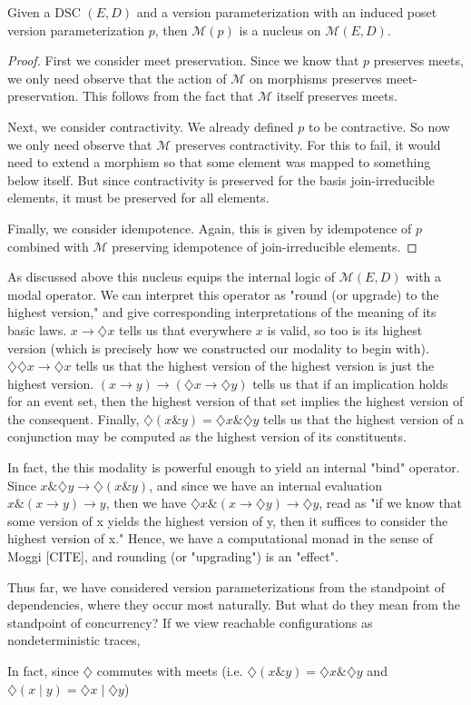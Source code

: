 \documentclass[hoptionsi,review,format=acmsmall]{acmart}
\theoremstyle{definition}
\newcommand{\Mcc}{\mathcal{M}}
\newcommand{\band}{\mathbin{\&}}
\newcommand{\bor}{\mathbin{|}}
\newcommand{\Dia}{\diamondsuit}
\begin{document}
\begin{theorem}
Given a DSC \((E,D)\) and a version parameterization with an induced poset version parameterization \(p\), then \(\Mcc(p)\) is a nucleus on \(\Mcc(E,D)\).
\end{theorem}
\begin{proof}
First we consider meet preservation. Since we know that \(p\) preserves meets, we only need observe that the action of \(\Mcc\) on morphisms preserves meet-preservation. This follows from the fact that \(\Mcc\) itself preserves meets.


Next, we consider contractivity. We already defined \(p\) to be contractive. So now we only need observe that \(\Mcc\) preserves contractivity. For this to fail, it would need to extend a morphism so that some element was mapped to something below itself. But since contractivity is preserved for the basis join-irreducible elements, it must be preserved for all elements.

Finally, we consider idempotence. Again, this is given by idempotence of \(p\) combined with \(\Mcc\) preserving idempotence of join-irreducible elements.
\end{proof}

As discussed above this nucleus equips the internal logic of \(\Mcc(E,D)\) with a modal operator. We can interpret this operator as "round (or upgrade) to the highest version," and give corresponding interpretations of the meaning of its basic laws. \(x \rightarrow \Dia{x}\) tells us that everywhere \(x\) is valid, so too is its highest version (which is precisely how we constructed our modality to begin with). \(\Dia\Dia{x} \rightarrow \Dia{x}\) tells us that the highest version of the highest version is just the highest version. \((x \rightarrow y) \rightarrow (\Dia{x} \rightarrow \Dia{y})\)  tells us that if an implication holds for an event set, then the highest version of that set implies the highest version of the consequent. Finally, \(\Dia(x \band y) = \Dia{x} \band \Dia{y}\) tells us that the highest version of a conjunction may be computed as the highest version of its constituents.

In fact, the this modality is powerful enough to yield an internal "bind" operator. Since \(x \band \Dia{y} \rightarrow \Dia(x \band y)\), and since we have an internal evaluation \(x \band (x \rightarrow y) \rightarrow y\), then we have \(\Dia{x} \band (x \rightarrow \Dia{y}) \rightarrow \Dia{y}\), read as "if we know that some version of x yields the highest version of y, then it suffices to consider the highest version of x." Hence, we have a computational monad in the sense of Moggi [CITE], and rounding (or "upgrading") is an "effect".


Thus far, we have considered version parameterizations from the standpoint of dependencies, where they occur most naturally. But what do they mean from the standpoint of concurrency? If we view reachable configurations as nondeterministic traces, 

In fact, since \(\Dia\) commutes with meets (i.e. \(\Dia(x \band y) = \Dia{x} \band \Dia{y}\) and  \(\Dia(x \bor y) = \Dia{x} \bor \Dia{y}\))
\end{document}
